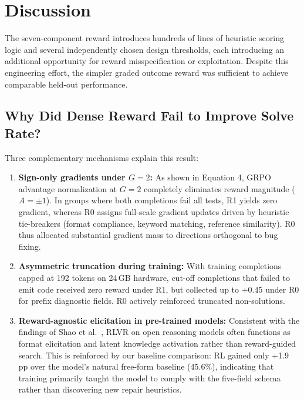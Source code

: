 \documentclass{article}
\begin{document}
\section{Discussion}
The seven-component reward introduces hundreds of lines of heuristic scoring logic and several independently chosen design thresholds, each introducing an additional opportunity for reward misspecification or exploitation. Despite this engineering effort, the simpler graded outcome reward was sufficient to achieve comparable held-out performance. 

\subsection{Why Did Dense Reward Fail to Improve Solve Rate?}
Three complementary mechanisms explain this result:
\begin{enumerate}
\item \textbf{Sign-only gradients under $G=2$:} As shown in Equation 4, GRPO advantage normalization at $G=2$ completely eliminates reward magnitude ($A = \pm 1$). In groups where both completions fail all tests, R1 yields zero gradient, whereas R0 assigns full-scale gradient updates driven by heuristic tie-breakers (format compliance, keyword matching, reference similarity). R0 thus allocated substantial gradient mass to directions orthogonal to bug fixing.
\item \textbf{Asymmetric truncation during training:} With training completions capped at 192 tokens on 24\,GB hardware, cut-off completions that failed to emit code received zero reward under R1, but collected up to $+0.45$ under R0 for prefix diagnostic fields. R0 actively reinforced truncated non-solutions.
\item \textbf{Reward-agnostic elicitation in pre-trained models:} Consistent with the findings of Shao et al.~\cite{Shao2025Spurious}, RLVR on open reasoning models often functions as format elicitation and latent knowledge activation rather than reward-guided search. This is reinforced by our baseline comparison: RL gained only +1.9 pp over the model's natural free-form baseline (45.6\%), indicating that training primarily taught the model to comply with the five-field schema rather than discovering new repair heuristics.
\end{enumerate}
\end{document}
